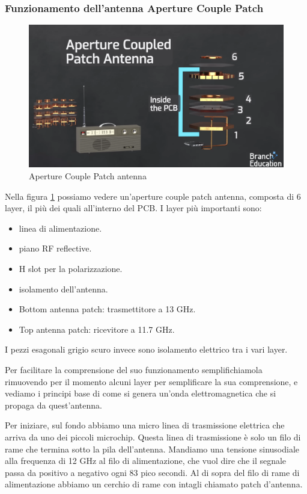 \subsubsection{Funzionamento dell'antenna Aperture Couple Patch}

\begin{figure}[htbp]
  \centering
  \includegraphics[width=0.8\linewidth]{./res/img/antenna_pcb.png}
  \caption{Aperture Couple Patch antenna \cite{branch_education_how_2022}}
  \label{fig:aperture-couple-patch-antenna}
\end{figure}

Nella figura \ref{fig:aperture-couple-patch-antenna} possiamo vedere un'aperture couple patch antenna, composta di 6 layer, il più dei quali all'interno del PCB.
I layer più importanti sono:
\begin{itemize}
  \item[1] linea di alimentazione.
  \item[2] piano RF reflective.
  \item[3] H slot per la polarizzazione.
  \item[4] isolamento dell'antenna.
  \item[5] Bottom antenna patch: trasmettitore a 13 GHz.
  \item[6] Top antenna patch: ricevitore a 11.7 GHz.
\end{itemize}
I pezzi esagonali grigio scuro invece sono isolamento elettrico tra i vari layer.

Per facilitare la comprensione del suo funzionamento semplifichiamola rimuovendo per il momento alcuni layer per semplificare la sua comprensione, e vediamo i principi base di come si genera un'onda elettromagnetica che si propaga da quest'antenna.

Per iniziare, sul fondo abbiamo una micro linea di trasmissione elettrica che arriva da uno dei piccoli microchip.
Questa linea di trasmissione è solo un filo di rame che termina sotto la pila dell'antenna.
Mandiamo una tensione sinusodiale alla frequenza di 12 GHz al filo di alimentazione, che vuol dire che il segnale passa da positivo a negativo ogni 83 pico secondi.
Al di sopra del filo di rame di alimentazione abbiamo un cerchio di rame con intagli chiamato patch d'antenna.

